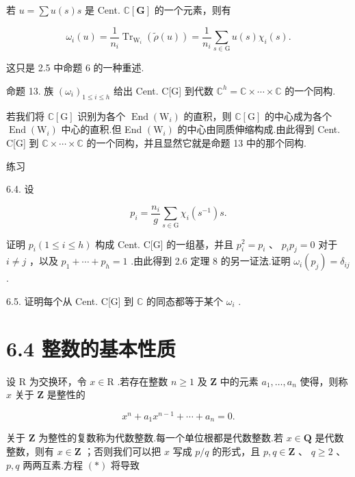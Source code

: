 \documentclass[10pt]{article}
\begin{document}
若 \(u = \sum u\left( s\right) s\) 是 Cent. \(\mathbb{C}\left\lbrack  \mathbf{G}\right\rbrack\) 的一个元素，则有

\[
{\omega }_{i}\left( u\right)  = \frac{1}{{n}_{i}}{\operatorname{Tr}}_{{\mathrm{W}}_{i}}\left( {\widetilde{\rho }\left( u\right) }\right)  = \frac{1}{{n}_{i}}\mathop{\sum }\limits_{{s \in  \mathrm{G}}}u\left( s\right) {\chi }_{i}\left( s\right) .
\]

这只是 2.5 中命题 6 的一种重述.

命题 13. 族 \({\left( {\omega }_{i}\right) }_{1 \leq  i \leq  h}\) 给出 Cent. C[G] 到代数 \({\mathbb{C}}^{h} = \mathbb{C} \times  \cdots  \times  \mathbb{C}\) 的一个同构.

若我们将 \(\mathbb{C}\left\lbrack  \mathrm{G}\right\rbrack\) 识别为各个 \(\operatorname{End}\left( {\mathrm{W}}_{i}\right)\) 的直积，则 \(\mathbb{C}\left\lbrack  \mathrm{G}\right\rbrack\) 的中心成为各个 \(\operatorname{End}\left( {\mathrm{W}}_{i}\right)\) 中心的直积.但 End \(\left( {\mathrm{W}}_{i}\right)\) 的中心由同质伸缩构成.由此得到 Cent. C[G] 到 \(\mathbb{C} \times  \cdots  \times  \mathbb{C}\) 的一个同构，并且显然它就是命题 13 中的那个同构.

练习

6.4. 设

\[
{p}_{i} = \frac{{n}_{i}}{g}\mathop{\sum }\limits_{{s \in  \mathrm{G}}}{\chi }_{i}\left( {s}^{-1}\right) s.
\]

证明 \({p}_{i}\left( {1 \leq  i \leq  h}\right)\) 构成 Cent. C[G] 的一组基，并且 \({p}_{i}^{2} = {p}_{i}\) 、 \({p}_{i}{p}_{j} = 0\) 对于 \(i \neq  j\) ，以及 \({p}_{1} + \cdots  + {p}_{h} = 1\) .由此得到 2.6 定理 8 的另一证法.证明 \({\omega }_{i}\left( {p}_{j}\right)  = {\delta }_{ij}\) .

6.5. 证明每个从 Cent. C[G] 到 \(\mathbb{C}\) 的同态都等于某个 \({\omega }_{i}\) .

\section*{6.4 整数的基本性质}

设 \(\mathrm{R}\) 为交换环，令 \(x \in  \mathrm{R}\) .若存在整数 \(n \geq  1\) 及 \(\mathbf{Z}\) 中的元素 \({a}_{1},\ldots ,{a}_{n}\) 使得，则称 \(x\) 关于 \(\mathbf{Z}\) 是整性的

\[
{x}^{n} + {a}_{1}{x}^{n - 1} + \cdots  + {a}_{n} = 0.
\]

关于 \(\mathbf{Z}\) 为整性的复数称为代数整数.每一个单位根都是代数整数.若 \(x \in  \mathbf{Q}\) 是代数整数，则有 \(x \in  \mathbf{Z}\) ；否则我们可以把 \(x\) 写成 \(p/q\) 的形式，且 \(p,q \in  \mathbf{Z}\) 、 \(q \geq  2\) 、 \(p,q\) 两两互素.方程 \(\left( *\right)\) 将导致
\end{document}
